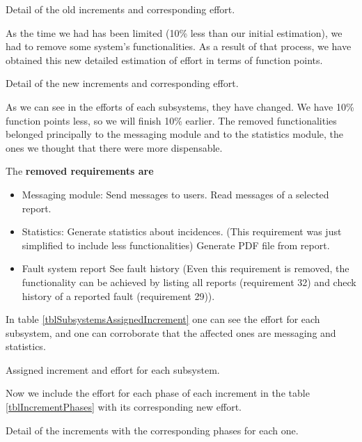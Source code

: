 \begin{table}[hbtp]
\centering

\caption{Detail of the old increments and corresponding effort.}
\label{tblIncrementsSubsystems}
\end{table}


As the time we had has been limited (10\% less than our initial estimation), we had to remove some system's functionalities. As a result of that process, we have obtained this new detailed estimation of effort in terms of function points.

\begin{table}[hbtp]
\centering

\caption{Detail of the new increments and corresponding effort.}
\label{tblIncrementsSubsystems}
\end{table}

As we can see in the efforts of each subsystems, they have changed. We have 10\% function points less, so we will finish 10\% earlier. The removed functionalities belonged principally to the messaging module and to the statistics module, the ones we thought that there were more dispensable.

The \textbf{removed requirements are} 

\begin{itemize}
\item Messaging module:
\subitem[21] Send messages to users.
\subitem[22] Read messages of a selected report.
\item Statistics:
\subitem[36] Generate statistics about incidences. (This requirement was just simplified to include less functionalities)
\subitem[37] Generate PDF file from report.
\item Fault system report
\subitem[26] See fault history (Even this requirement is removed, the functionality can be achieved by listing all reports (requirement 32) and check history of a reported fault (requirement 29)).
\end{itemize}



In table \ref{tblSubsystemsAssignedIncrement} one can see the effort for each subsystem, and one can corroborate that the affected ones are messaging and statistics.

\begin{table}[hbtp]
\centering

\caption{Assigned increment and effort for each subsystem.}
\label{tblSubsystemsAssignedIncrement}
\end{table}

Now we include the effort for each phase of each increment in the table \ref{tblIncrementPhases} with its corresponding new effort.

\begin{table}[hbtp]
\centering

\caption{Detail of the increments with the corresponding phases for each one.}
\label{tblIncrementPhases}
\end{table}